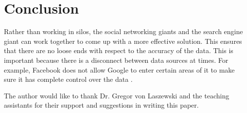 \documentclass[sigconf]{acmart}
\begin{document}
\section{Conclusion}

Rather than working in silos, the social networking giants and the search engine giant can work together to come up with a more effective solution. This ensures that there are no loose ends with respect to the accuracy of the data. This is important because there is a disconnect between data sources at times. For example, Facebook does not allow Google to enter certain areas of it to make sure it has complete control over the data \cite{www-android}.

\begin{acks}

The author would like to thank Dr. Gregor von Laszewski and the teaching assistants for their support and suggestions in writing this paper.

\end{acks}


 
\end{document}
